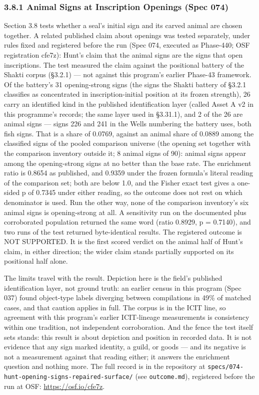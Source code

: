 \documentclass[
]{article}
\newcounter{none} %
\begin{document}
\subsubsection{3.8.1 Animal Signs at Inscription Openings
(Spec 074)}\label{animal-signs-at-inscription-openings-spec-074}

Section 3.8 tests whether a seal's initial sign and its carved
animal are chosen together. A related published claim about
openings was tested separately, under rules fixed and
registered before the run (Spec 074, executed as Phase-440;
OSF registration cfe7z): Hunt's claim that the animal signs are
the signs that open inscriptions. The test measured the claim
against the positional battery of the Shakti corpus (§3.2.1)
--- not against this program's earlier Phase-43 framework. Of the battery's 31 opening-strong signs (the signs the Shakti battery of §3.2.1 classifies as concentrated in inscription-initial position at its frozen strength), 26 carry an identified kind in the published identification layer (called Asset A v2 in this programme's records; the same layer used in §3.31.1), and 2 of the 26 are animal signs
--- signs 226 and 241 in the Wells numbering the battery uses,
both fish signs. That is a share of 0.0769, against an animal share of 0.0889 among the classified signs of the pooled comparison universe (the opening set together with the comparison inventory outside it; 8 animal signs of 90): animal signs appear among the opening-strong signs at
no better than the base rate. The enrichment ratio is 0.8654 as
published, and 0.9359 under the frozen formula's literal
reading of the comparison set; both are below 1.0, and the
Fisher exact test gives a one-sided p of 0.7345 under either
reading, so the outcome does not rest on which denominator is
used. Run the other way, none of the comparison inventory's six
animal signs is opening-strong at all. A sensitivity run on the
documented plus corroborated population returned the same word
(ratio 0.8929, p = 0.7140), and two runs of the test returned
byte-identical results. The registered outcome is NOT
SUPPORTED. It is the first scored verdict on the animal half of
Hunt's claim, in either direction; the wider claim stands
partially supported on its positional half alone.

The limits travel with the result. Depiction here is the
field's published identification layer, not ground truth: an
earlier census in this program (Spec 037) found object-type
labels diverging between compilations in 49\% of matched cases,
and that caution applies in full. The corpus is in the ICIT
line, so agreement with this program's earlier ICIT-lineage
measurements is consistency within one tradition, not
independent corroboration. And the fence the test itself sets
stands: this result is about depiction and position in recorded
data. It is not evidence that any sign marked identity, a
guild, or goods --- and its negative is not a measurement
against that reading either; it answers the enrichment question
and nothing more. The full record is in the repository at
\texttt{specs/074-hunt-opening-signs-repaired-surface/} (see
\texttt{outcome.md}), registered before the run at OSF:
\url{https://osf.io/cfe7z}.
\end{document}
